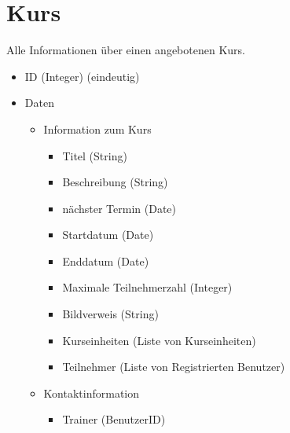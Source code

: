 \documentclass[a4paper]{scrreprt}
\newcounter{Lc}
\newcounter{Hc}
\newcommand{\stepHc}{\stepcounter{Hc}\setcounter{Lc}{0}}
\begin{document}
\section{Kurs}
\Func {} Alle Informationen über einen angebotenen Kurs. 
\begin{itemize}
	\item ID (Integer) (eindeutig)
	\item Daten
	\begin{itemize}
		\item Information zum Kurs
		\begin{itemize}
			\item Titel (String)
			\item Beschreibung (String)
			\item nächster Termin (Date)
			\item Startdatum (Date)
			\item Enddatum (Date)
			\item Maximale Teilnehmerzahl (Integer)
			\item Bildverweis (String)
			\item Kurseinheiten (Liste von Kurseinheiten)
			\item Teilnehmer (Liste von Registrierten Benutzer)
		\end{itemize}
		\item Kontaktinformation
		\begin{itemize}
			\item Trainer (BenutzerID)
		\end{itemize}	
	\end{itemize}
	
	
	
\end{itemize}
\stepHc		    
\end{document}
